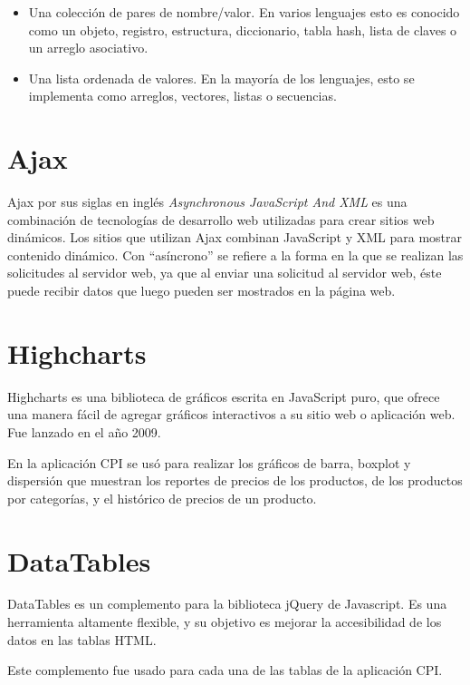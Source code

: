 \begin{itemize}
	\item Una colección de pares de nombre/valor. En varios lenguajes esto es conocido como un objeto, registro, estructura, diccionario, tabla hash, lista de claves o un arreglo asociativo.
    \item Una lista ordenada de valores. En la mayoría de los lenguajes, esto se implementa como arreglos, vectores, listas o secuencias.
\end{itemize}

\section{Ajax}
Ajax por sus siglas en inglés \textit{Asynchronous JavaScript And XML} es una combinación de tecnologías de desarrollo web utilizadas para crear sitios web dinámicos. Los sitios que utilizan Ajax combinan JavaScript y XML para mostrar contenido dinámico. \cite{ajaxChristensson} Con “asíncrono” se refiere a la forma en la que se realizan las solicitudes al servidor web, ya que al enviar una solicitud al servidor web, éste puede recibir datos que luego pueden ser mostrados en la página web.

\section{Highcharts}
Highcharts es una biblioteca de gráficos escrita en JavaScript puro, que ofrece una manera fácil de agregar gráficos interactivos a su sitio web o aplicación web. Fue lanzado en el año 2009. \cite{highcharts} 

En la aplicación CPI se usó para realizar los gráficos de barra, boxplot y dispersión que muestran los reportes de precios de los productos, de los productos por categorías, y el histórico de precios de un producto.


\section{DataTables}
DataTables es un complemento para la biblioteca jQuery de Javascript. Es una herramienta altamente flexible, y su objetivo es mejorar la accesibilidad de los datos en las tablas HTML. \cite{dataTables} 

Este complemento fue usado para cada una de las tablas de la aplicación CPI.


